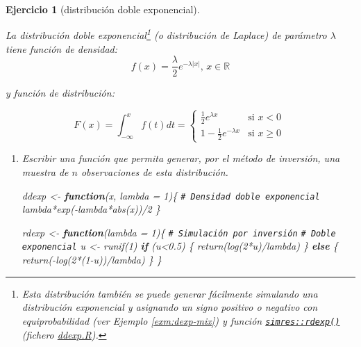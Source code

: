 \documentclass[
]{book}
\newenvironment{Shaded}{\begin{snugshade}}{\end{snugshade}}
\newcommand{\AttributeTok}[1]{\textcolor[rgb]{0.77,0.63,0.00}{#1}}
\newcommand{\CommentTok}[1]{\textcolor[rgb]{0.56,0.35,0.01}{\textit{#1}}}
\newcommand{\ControlFlowTok}[1]{\textcolor[rgb]{0.13,0.29,0.53}{\textbf{#1}}}
\newcommand{\DecValTok}[1]{\textcolor[rgb]{0.00,0.00,0.81}{#1}}
\newcommand{\FloatTok}[1]{\textcolor[rgb]{0.00,0.00,0.81}{#1}}
\newcommand{\FunctionTok}[1]{\textcolor[rgb]{0.00,0.00,0.00}{#1}}
\newcommand{\NormalTok}[1]{#1}
\newcommand{\OtherTok}[1]{\textcolor[rgb]{0.56,0.35,0.01}{#1}}
\newcommand{\SpecialCharTok}[1]{\textcolor[rgb]{0.00,0.00,0.00}{#1}}
\theoremstyle{break}
\newtheorem{exercise}{Ejercicio}[chapter]
\theoremstyle{nonumberplain}
\renewcommand{\CommentTok}[1]{\textcolor[rgb]{0.41,0.41,0.41}{\texttt{#1}}}
\begin{document}
\begin{exercise}[distribución doble exponencial]
\protect\hypertarget{exr:ddexp}{}\label{exr:ddexp}

La distribución doble exponencial\footnote{Esta distribución también se puede generar fácilmente simulando una distribución exponencial y asignando un signo positivo o negativo con equiprobabilidad (ver Ejemplo \ref{exm:dexp-mix}) y función \href{https://rubenfcasal.github.io/simres/reference/ddexp.html}{\texttt{simres::rdexp()}} (fichero \href{R/ddexp.R}{\emph{ddexp.R}}).} (o distribución de Laplace) de
parámetro \(\lambda\) tiene función de densidad:
\[f(x)  =\frac{\lambda}{2}e^{-\lambda\left\vert x\right\vert
}\text{, }x\in\mathbb{R}\]

y función de distribución:

\[F(x)  =\int_{-\infty}^{x}f\left( t\right)  dt=\left\{
\begin{array}{ll}
\frac{1}{2}e^{\lambda x} & \text{si } x<0\\
1-\frac{1}{2}e^{-\lambda x} & \text{si } x\geq0
\end{array}
\ \right.\]

\begin{enumerate}
\def\labelenumi{\alph{enumi})}
\item
  Escribir una función que permita generar, por el método de
  inversión, una muestra de \(n\) observaciones de esta distribución.

\begin{Shaded}
\begin{Highlighting}[]
\NormalTok{ddexp }\OtherTok{\textless{}{-}} \ControlFlowTok{function}\NormalTok{(x, }\AttributeTok{lambda =} \DecValTok{1}\NormalTok{)\{}
\CommentTok{\# Densidad doble exponencial}
\NormalTok{  lambda}\SpecialCharTok{*}\FunctionTok{exp}\NormalTok{(}\SpecialCharTok{{-}}\NormalTok{lambda}\SpecialCharTok{*}\FunctionTok{abs}\NormalTok{(x))}\SpecialCharTok{/}\DecValTok{2}
\NormalTok{\}}

\NormalTok{rdexp }\OtherTok{\textless{}{-}} \ControlFlowTok{function}\NormalTok{(}\AttributeTok{lambda =} \DecValTok{1}\NormalTok{)\{}
\CommentTok{\# Simulación por inversión}
\CommentTok{\# Doble exponencial}
\NormalTok{  u }\OtherTok{\textless{}{-}} \FunctionTok{runif}\NormalTok{(}\DecValTok{1}\NormalTok{)}
  \ControlFlowTok{if}\NormalTok{ (u}\SpecialCharTok{\textless{}}\FloatTok{0.5}\NormalTok{) \{}
    \FunctionTok{return}\NormalTok{(}\FunctionTok{log}\NormalTok{(}\DecValTok{2}\SpecialCharTok{*}\NormalTok{u)}\SpecialCharTok{/}\NormalTok{lambda)}
\NormalTok{  \} }\ControlFlowTok{else}\NormalTok{ \{}
    \FunctionTok{return}\NormalTok{(}\SpecialCharTok{{-}}\FunctionTok{log}\NormalTok{(}\DecValTok{2}\SpecialCharTok{*}\NormalTok{(}\DecValTok{1}\SpecialCharTok{{-}}\NormalTok{u))}\SpecialCharTok{/}\NormalTok{lambda)}
\NormalTok{  \}}
\NormalTok{\}}


\end{Highlighting}
\end{Shaded}
\end{enumerate}
\end{exercise}
\end{document}
